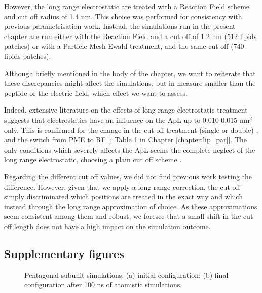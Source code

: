However, the long range electrostatic are treated with a Reaction Field scheme and cut off radius of 1.4 nm. This choice was performed for consistency with previous parametrisation work.
%
Instead, the simulations run in the present chapter are run either with the Reaction Field and a cut off of 1.2 nm (512 lipids patches) or with a Particle Mesh Ewald treatment, and the same cut off (740 lipids patches).

Although briefly mentioned in the body of the chapter, we want to reiterate that these discrepancies might affect the simulations, but in measure smaller than the peptide or the electric field, which effect we want to assess.

Indeed, extensive literature on the effects of long range electrostatic treatment suggests that electrostatics have an influence on the ApL up to 0.010-0.015 nm$^2$ only. This is confirmed for the change in the cut off treatment (single or double) \citep{Silva2018,Reisser2017}, and the switch from PME to RF [\citet{Poger2012}; Table 1 in Chapter \ref{chapter:lip_par}].
%
The only conditions which severely affects the ApL seems the complete neglect of the long range electrostatic, choosing a plain cut off scheme \citep{Patra2003}.

Regarding the different cut off values, we did not find previous work testing the difference. However, given that we apply a long range correction, the cut off simply discriminated which positions are treated in the exact way and which instead through the long range approximation of choice. As these approximations seem consistent among them and robust, we foresee that a small shift in the cut off length does not have a high impact on the simulation outcome.


\subsection{Supplementary figures}
\begin{figure}[t]
\centering
{}
\caption[SI: pentagonal subunit simulations]{Pentagonal subunit simulations: (a) initial configuration; (b) final configuration after 100 ns of atomistic simulations.}
\label{fig:penta_results_SI}
\end{figure}

